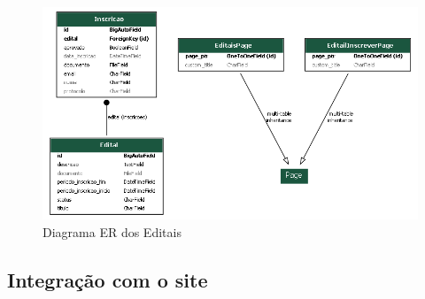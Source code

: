 \begin{figure}[htb]
	\centering
	 \begin{minipage}{0.4\textwidth}
	   \centering
	   \caption{Diagrama ER dos Editais} \label{er_diagram_editais}
	   \includegraphics[scale=0.5]{./img/er_diagram_editais.png}
	 \end{minipage}
   \end{figure}


\subsection{Integração com o site}
